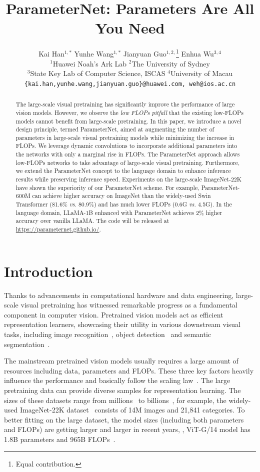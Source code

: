 \documentclass[10pt,twocolumn,letterpaper]{article}
\title{ParameterNet: Parameters Are All You Need}
\author{Kai Han$^{1,*}$ \hspace{0.23cm} Yunhe Wang$^{1,*}$ \hspace{0.23cm} Jianyuan Guo$^{1,2,}$\thanks{Equal contribution.} \hspace{0.23cm} Enhua Wu$^{3,4}$\\
$^1$Huawei Noah's Ark Lab \hspace{0.23cm} $^2$The University of Sydney\\
$^3$State Key Lab of Computer Science, ISCAS \hspace{0.23cm} $^4$University of Macau\\
{\tt\small \{kai.han,yunhe.wang,jianyuan.guo\}@huawei.com, weh@ios.ac.cn}
}
\begin{document}
\maketitle

\begin{abstract}
The large-scale visual pretraining has significantly improve the performance of large vision models. However, we observe the \emph{low FLOPs pitfall} that the existing low-FLOPs models cannot benefit from large-scale pretraining.
In this paper, we introduce a novel design principle, termed ParameterNet, aimed at augmenting the number of parameters in large-scale visual pretraining models while minimizing the increase in FLOPs. We leverage dynamic convolutions to incorporate additional parameters into the networks with only a marginal rise in FLOPs. The ParameterNet approach allows low-FLOPs networks to take advantage of large-scale visual pretraining. Furthermore, we extend the ParameterNet concept to the language domain to enhance inference results while preserving inference speed.
Experiments on the large-scale ImageNet-22K have shown the superiority of our ParameterNet scheme. For example, ParameterNet-600M can achieve higher accuracy on ImageNet than the widely-used Swin Transformer (81.6\% \emph{vs.} 80.9\%) and has much lower FLOPs (0.6G \emph{vs.} 4.5G). In the language domain, LLaMA-1B enhanced with ParameterNet achieves 2\% higher accuracy over vanilla LLaMA. The code will be released at \url{https://parameternet.github.io/}.
\end{abstract}

\section{Introduction}
\label{sec:intro}
Thanks to advancements in computational hardware and data engineering, large-scale visual pretraining has witnessed remarkable progress as a fundamental component in computer vision. Pretrained vision models act as efficient representation learners, showcasing their utility in various downstream visual tasks, including image recognition~\cite{imagenet,efficientnetv2}, object detection~\cite{swin,pvt} and semantic segmentation~\cite{he2017mask,setr}.

The mainstream pretrained vision models usually requires a large amount of resources including data, parameters and FLOPs. These three key factors heavily influence the performance and basically follow the scaling law~\cite{zhai2022scaling}. The large pretraining data can provide diverse samples for representation learning. The sizes of these datasets range from millions~\cite{imagenet,kuznetsova2020open} to billions~\cite{sun2017revisiting,thomee2015new}, for example, the widely-used ImageNet-22K dataset~\cite{imagenet} consists of 14M images and 21,841 categories. To better fitting on the large dataset, the model sizes (including both parameters and FLOPs) are getting larger and larger in recent years, \eg, ViT-G/14 model has 1.8B parameters and 965B FLOPs~\cite{zhai2022scaling}.
\end{document}

